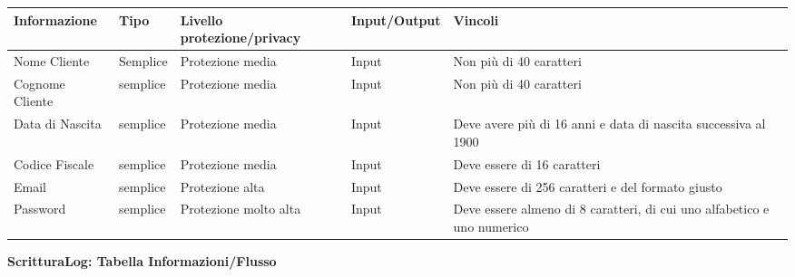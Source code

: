 \begin{tabular} {|P{3cm}|P{3cm}|P{3cm}|P{3cm}|P{3cm}|}
    \hline
    \textbf{Informazione} & \textbf{Tipo} & \textbf{Livello protezione/privacy} & \textbf{Input/Output} & \textbf{Vincoli}                                                        \\
    \hline
    Nome Cliente          & Semplice      & Protezione media                    & Input                 & Non più di 40 caratteri                                                 \\
    \hline
    Cognome Cliente       & semplice      & Protezione media                    & Input                 & Non più di 40 caratteri                                                 \\
    \hline
    Data di Nascita       & semplice      & Protezione media                    & Input                 & Deve avere più di 16 anni e data di nascita successiva al 1900          \\
    \hline
    Codice Fiscale        & semplice      & Protezione media                    & Input                 & Deve essere di 16 caratteri                                             \\
    \hline
    Email                 & semplice      & Protezione alta                     & Input                 & Deve essere di 256 caratteri e del formato giusto                       \\
    \hline
    Password              & semplice      & Protezione molto alta               & Input                 & Deve essere almeno di 8 caratteri, di cui uno alfabetico e uno numerico \\
    \hline
\end{tabular}
\hfill \break

\textbf{ScritturaLog: Tabella Informazioni/Flusso}
\hfill \break

